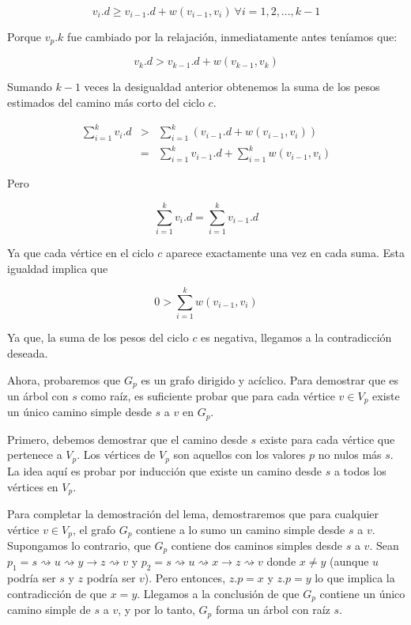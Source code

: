 \documentclass[12pt]{article}
\newcommand{\nl}{\vspace{0.3cm}}
\begin{document}
$$ v_{i}.d \geqslant v_{i-1}.d + w(v_{i-1}, v_i) \ \forall i = 1, 2, ..., k-1$$

Porque $v_{p}.k$ fue cambiado por la relajación, inmediatamente antes teníamos que:

$$ v_{k}.d > v_{k-1}.d + w(v_{k-1}, v_k)$$

Sumando $k-1$ veces la desigualdad anterior obtenemos la suma de los pesos estimados del camino más corto del ciclo $c$.

\begin{eqnarray*}
	\sum_{i=1}^{k} v_{i}.d 	& > & \sum_{i=1}^{k}(v_{i-1}.d + w(v_{i-1}, v_i)) \\
	& = & \sum_{i=1}^{k} v_{i-1}.d + \sum_{i=1}^{k} w(v_{i-1},v_i)
\end{eqnarray*}

Pero

$$ \sum_{i=1}^{k} v_{i}.d = \sum_{i=1}^{k} v_{i-1}.d $$

Ya que cada vértice en el ciclo $c$ aparece exactamente una vez en cada suma. Esta igualdad implica que

$$ 0 > \sum_{i=1}^{k} w(v_{i-1},v_i) $$

Ya que, la suma de los pesos del ciclo $c$ es negativa, llegamos a la contradicción deseada.

\nl

Ahora, probaremos que $G_p$ es un grafo dirigido y acíclico. Para demostrar que es un árbol con $s$ como raíz, es suficiente probar que para cada vértice $v \in V_p$ existe un único camino simple desde $s$ a $v$ en $G_p$.

\nl

Primero, debemos demostrar que el camino desde $s$ existe para cada vértice que pertenece a $V_p$. Los vértices de $V_p$ son aquellos con los valores $p$ no nulos más $s$. La idea aquí es probar por inducción que existe un camino desde $s$ a todos los vértices en $V_p$.

\nl

Para completar la demostración del lema, demostraremos que para cualquier vértice $v \in V_p$, el grafo $G_p$ contiene a lo sumo un camino simple desde $s$ a $v$. Supongamos lo contrario, que $G_p$ contiene dos caminos simples desde $s$ a $v$. Sean $p_1 = s \rightsquigarrow u \rightsquigarrow y \rightarrow z \rightsquigarrow v $ y $p_2 = s \rightsquigarrow u \rightsquigarrow x \rightarrow z \rightsquigarrow v $ donde $x \neq y$ (aunque $u$ podría ser $s$ y $z$ podría ser $v$). Pero entonces, $z.p = x$ y $z.p = y$ lo que implica la contradicción de que $x = y$. Llegamos a la conclusión de que $G_p$ contiene un único camino simple de $s$ a $v$, y por lo tanto, $G_p$ forma un árbol con raíz $s$.
\end{document}
